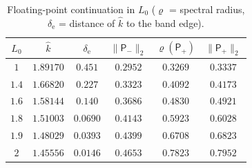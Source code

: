 \begin{table}[tbhp]
\caption{Floating-point continuation in $L_0$ ($\varrho$ = spectral radius, $\delta_{\mathrm e}$ = distance of $\widehat k$ to the band edge).}
\label{sm:tab-float}
\centering\small
\begin{tabular}{cccccc}
\toprule
$L_0$ & $\widehat k$ & $\delta_{\mathrm e}$ & $\|\mathsf P_-\|_2$ & $\varrho(\mathsf P_+)$ & $\|\mathsf P_+\|_2$\\
\midrule
$1$ & $1.89170$ & $0.451$ & $0.2952$ & $0.3269$ & $0.3337$\\
$1.4$ & $1.66820$ & $0.227$ & $0.3323$ & $0.4092$ & $0.4173$\\
$1.6$ & $1.58144$ & $0.140$ & $0.3686$ & $0.4830$ & $0.4921$\\
$1.8$ & $1.51003$ & $0.0690$ & $0.4143$ & $0.5923$ & $0.6028$\\
$1.9$ & $1.48029$ & $0.0393$ & $0.4399$ & $0.6708$ & $0.6823$\\
$2$ & $1.45556$ & $0.0146$ & $0.4653$ & $0.7823$ & $0.7952$\\
\bottomrule
\end{tabular}
\end{table}
